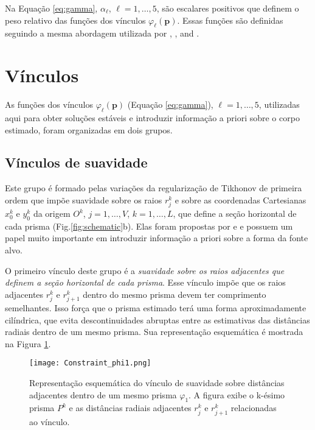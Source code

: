 Na Equação \ref{eq:gamma}, $\alpha_{\ell}$, $\ell = 1, \dots, 5$, são escalares positivos que definem o peso relativo das funções dos vínculos $\varphi_{\ell}(\mathbf{p})$.
Essas funções são definidas seguindo a mesma abordagem utilizada por \citet{oliveirajr_etal2011}, \citet{oliveirajr_barbosa2013}, and \citet{vital_etal2019}.

\section{Vínculos}\label{sec:constraints}

As funções dos vínculos $\varphi_{\ell}(\mathbf{p})$ (Equação \ref{eq:gamma}), $\ell = 1, \dots, 5$, utilizadas aqui para obter soluções estáveis e introduzir informação a priori sobre o corpo estimado, foram organizadas em dois grupos.

\subsection{Vínculos de suavidade}

Este grupo é formado pelas variações da regularização de Tikhonov de primeira ordem \cite[][ p. 103]{aster_etal2019} que impõe suavidade sobre os raios $r_{j}^{k}$ e sobre as coordenadas Cartesianas $x_{0}^{k}$ e $y_{0}^{k}$ da origem $O^{k}$, $j = 1, \dots, V$, $k = 1, \dots, L$, que define a seção horizontal de cada prisma (Fig.\ref{fig:schematic}b).
Elas foram propostas por \cite{oliveirajr_etal2011} e \cite{oliveirajr_barbosa2013} e possuem um papel muito importante em introduzir informação a priori sobre a forma da fonte alvo. 

O primeiro vínculo deste grupo é a \textit{suavidade sobre os raios adjacentes que definem a seção horizontal de cada prisma}. Esse vínculo impõe que os raios adjacentes $r_{j}^{k}$ e $r_{j+1}^{k}$ dentro do mesmo prisma devem ter comprimento semelhantes. Isso força que o prisma estimado terá uma forma aproximadamente cilíndrica, que evita descontinuidades abruptas entre as estimativas das distâncias radiais dentro de um mesmo prisma. Sua representação esquemática é mostrada na Figura \ref{fig:phi1}.

\begin{figure}[!htb]
	\centering
	\texttt{[image: Constraint\_phi1.png]}
	\caption{Representação esquemática do vínculo de suavidade sobre distâncias adjacentes dentro de um mesmo prisma $\varphi_{1}$. A figura exibe o k-ésimo prisma $P^k$ e as distâncias radiais adjacentes $r_j^k$ e $r_{j+1}^k$ relacionadas ao vínculo.}
	\label{fig:phi1}
\end{figure}

